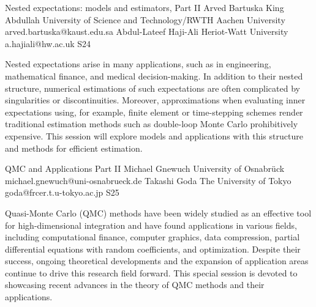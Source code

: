 \begin{session}
 {Nested expectations: models and estimators, Part II}%
 {Arved Bartuska}%
 {King Abdullah University of Science and Technology/RWTH Aachen University}%
 {arved.bartuska@kaust.edu.sa}%
 {Abdul-Lateef Haji-Ali}%
 {Heriot-Watt University}%
 {a.hajiali@hw.ac.uk}%
 {S24}%
{}

 Nested expectations arise in many applications, such as in engineering, mathematical finance, and medical decision-making. In addition to their nested structure, numerical estimations of such expectations are often complicated by singularities or discontinuities. Moreover, approximations when evaluating inner expectations using, for example, finite element or time-stepping schemes render traditional estimation methods such as double-loop Monte Carlo prohibitively expensive. This session will explore models and applications with this structure and methods for efficient estimation.
\end{session}



\clearpage

\begin{session}
 {QMC and Applications Part II}%
 {Michael Gnewuch}%
 {University of Osnabr\"uck}%
 {michael.gnewuch@uni-osnabrueck.de}%
 {Takashi Goda}%
 {The University of Tokyo}%
 {goda@frcer.t.u-tokyo.ac.jp}%
 {S25}%
 {}%

 Quasi-Monte Carlo (QMC) methods have been widely studied as an effective tool for high-dimensional integration and have found applications in various fields, including computational finance, computer graphics, data compression, partial differential equations with random coefficients, and %
 optimization.
 Despite their success, ongoing theoretical developments and the expansion of application areas continue to drive this research field forward. This special session is devoted to showcasing recent advances in the theory of QMC methods and their applications.
\end{session}

